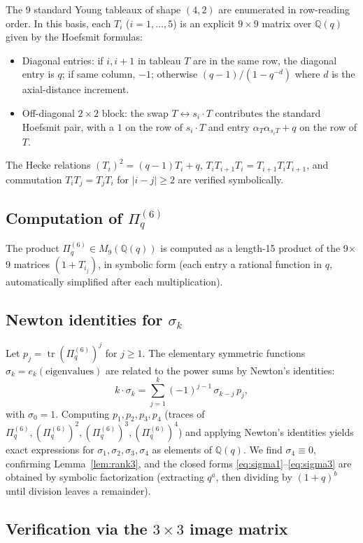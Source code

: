\documentclass[11pt]{article}
\theoremstyle{plain}
\theoremstyle{definition}
\theoremstyle{remark}
\newcommand{\Q}{\mathbb{Q}}
\newcommand{\Pibs}{\Pi_q}
\newcommand{\trace}{\operatorname{tr}}
\begin{document}
The 9 standard Young tableaux of shape $(4,2)$ are enumerated in row-reading
order. In this basis, each $T_i$ ($i = 1, \ldots, 5$) is an explicit
$9 \times 9$ matrix over $\Q(q)$ given by the Hoefsmit formulas:
\begin{itemize}
\item Diagonal entries: if $i, i+1$ in tableau $T$ are in the same row, the
diagonal entry is $q$; if same column, $-1$; otherwise
$(q-1)/(1 - q^{-d})$ where $d$ is the axial-distance increment.
\item Off-diagonal $2 \times 2$ block: the swap $T \leftrightarrow s_i \cdot T$
contributes the standard Hoefsmit pair, with a $1$ on the row of $s_i \cdot T$
and entry $\alpha_T \alpha_{s_i T} + q$ on the row of $T$.
\end{itemize}
The Hecke relations $(T_i)^2 = (q-1)T_i + q$, $T_i T_{i+1} T_i = T_{i+1} T_i T_{i+1}$,
and commutation $T_i T_j = T_j T_i$ for $|i - j| \geq 2$ are verified
symbolically.

\subsection{Computation of $\Pibs^{(6)}$}

The product $\Pibs^{(6)} \in M_9(\Q(q))$ is computed as a length-15 product
of the 9$\times$9 matrices $(1+T_{i_j})$, in symbolic form (each entry a
rational function in $q$, automatically simplified after each multiplication).

\subsection{Newton identities for $\sigma_k$}

Let $p_j = \trace(\Pibs^{(6)})^j$ for $j \geq 1$. The elementary
symmetric functions $\sigma_k = e_k(\text{eigenvalues})$ are related to the
power sums by Newton's identities:
\[
k \cdot \sigma_k = \sum_{j=1}^{k}(-1)^{j-1}\, \sigma_{k-j}\, p_j,
\]
with $\sigma_0 = 1$. Computing $p_1, p_2, p_3, p_4$ (traces of
$\Pibs^{(6)}, (\Pibs^{(6)})^2, (\Pibs^{(6)})^3, (\Pibs^{(6)})^4$) and
applying Newton's identities yields exact expressions for $\sigma_1, \sigma_2, \sigma_3, \sigma_4$
as elements of $\Q(q)$. We find $\sigma_4 \equiv 0$, confirming
Lemma~\ref{lem:rank3}, and the closed forms \eqref{eq:sigma1}--\eqref{eq:sigma3}
are obtained by symbolic factorization (extracting $q^a$, then dividing by
$(1+q)^b$ until division leaves a remainder).

\subsection{Verification via the $3 \times 3$ image matrix}\label{ssec:image-matrix}
\end{document}
